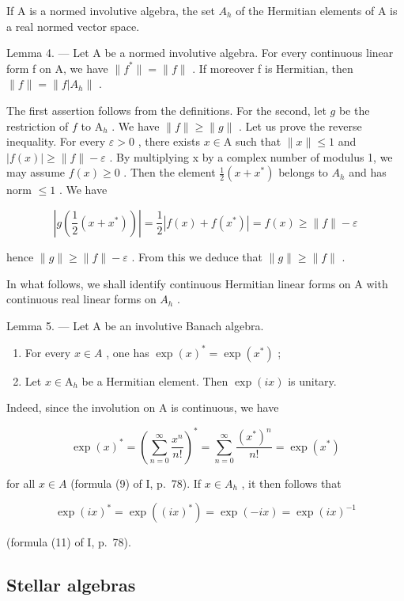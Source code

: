 If A is a normed involutive algebra, the set \(A_{h}\) of the Hermitian elements of A is a real normed vector space.

Lemma 4. --- Let A be a normed involutive algebra. For every continuous linear form f on A, we have \(\|f^{*}\|=\|f\|\) . If moreover f is Hermitian, then \(\|f\|=\|f|A_{h}\|\) .

The first assertion follows from the definitions. For the second, let \(g\) be the restriction of \(f\) to \(\mathrm{A}_h\) . We have \(\| f \| \geqslant \| g \|\) . Let us prove the reverse inequality. For every \(\varepsilon > 0\) , there exists \(x \in \mathrm{A}\) such that \(\| x \| \leqslant 1\) and \(|f(x)| \geqslant \|f\| - \varepsilon\) . By multiplying x by a complex number of modulus 1, we may assume \(f(x) \geqslant 0\) . Then the element \(\frac{1}{2}(x + x^{*})\) belongs to \(A_{h}\) and has norm \(\leqslant 1\) . We have

\[
\left| g \left(\frac {1}{2} (x + x ^ {*})\right) \right| = \frac {1}{2} | f (x) + f (x ^ {*}) | = f (x) \geqslant \| f \| - \varepsilon
\]

hence \(\|g\|\geqslant\|f\|-\varepsilon\) . From this we deduce that \(\|g\|\geqslant\|f\|\) .

In what follows, we shall identify continuous Hermitian linear forms on A with continuous real linear forms on \(A_{h}\) .

Lemma 5. --- Let A be an involutive Banach algebra.

\begin{enumerate}
\def\labelenumi{\alph{enumi})}
\item
  For every \(x \in A\) , one has \(\exp(x)^{*} = \exp(x^{*})\) ;
\item
  Let \(x \in \mathrm{A}_h\) be a Hermitian element. Then \(\exp(ix)\) is unitary.
\end{enumerate}

Indeed, since the involution on A is continuous, we have

\[
\exp (x) ^ {*} = \left(\sum_ {n = 0} ^ {\infty} \frac {x ^ {n}}{n !}\right) ^ {*} = \sum_ {n = 0} ^ {\infty} \frac {(x ^ {*}) ^ {n}}{n !} = \exp (x ^ {*})
\]

for all \(x \in A\) (formula (9) of I, p.~78). If \(x \in A_{h}\) , it then follows that

\[
\exp (i x) ^ {*} = \exp ((i x) ^ {*}) = \exp (- i x) = \exp (i x) ^ {- 1}
\]

(formula (11) of I, p.~78).

\subsection{Stellar algebras}

